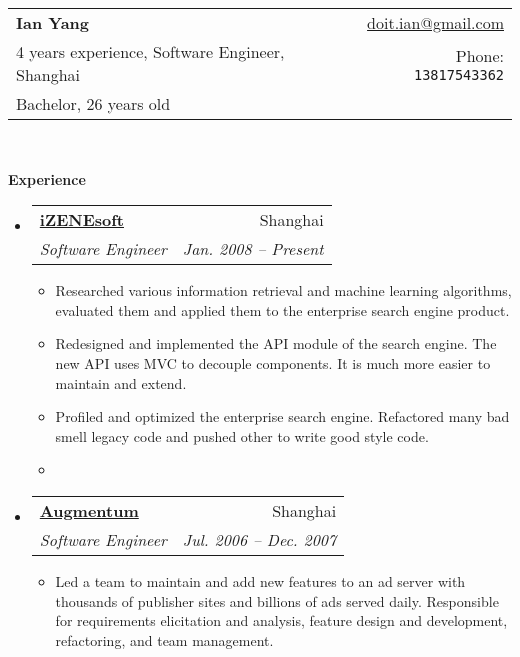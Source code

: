 \documentclass[letterpaper,11pt]{article}
\makeatletter
\newcommand{\resitem}[1]{\item #1 \vspace{-2pt}}
\newcommand{\resheading}[1]{{\large \colorbox{mygrey}{\begin{minipage}{\textwidth}{\textbf{#1 \vphantom{p\^{E}}}}\end{minipage}}}}
\newcommand{\ressubheading}[4]{
\begin{tabular*}{6.5in}{l@{\extracolsep{\fill}}r}
		\textbf{#1} & #2 \\
		\textit{#3} & \textit{#4} \\
\end{tabular*}\vspace{-6pt}}
\makeatother
\begin{document}
\newcommand{\mywebheader}{
\begin{tabular*}{7in}{l@{\extracolsep{\fill}}r}
	\textbf{\LARGE Ian Yang} & \href{mailto:doit.ian@gmail.com}{doit.ian@gmail.com} \\
    {\small 4 years experience, Software Engineer, Shanghai} & {\small Phone: \texttt{13817543362}} \\
    {\footnotesize Bachelor, 26 years old} & \\
	\end{tabular*}
\\
\vspace{0.1in}}

\mywebheader

\resheading{Experience}

\begin{itemize}
\item
  \ressubheading{\href{http://www.izenesoft.com/EN/home.html}{iZENEsoft}}{Shanghai}{%
    Software Engineer}{Jan. 2008 -- Present}

  { \footnotesize
    \begin{itemize}
      \resitem{Researched various information retrieval and machine learning
        algorithms, evaluated them and applied them to the enterprise search
        engine product.}
      
      \resitem{Redesigned and implemented the API module of the search
        engine. The new API uses MVC to decouple components. It is much more
        easier to maintain and extend.}

      \resitem{Profiled and optimized the enterprise search engine. Refactored
        many bad smell legacy code and pushed other to write good style code.}

      \resitem{
        
      }

      
    \end{itemize}
  }

\item \ressubheading{\href{http://www.augmentum.com/}{Augmentum}}{Shanghai}{%
      Software Engineer}{Jul. 2006 -- Dec. 2007}

  { \footnotesize
    \begin{itemize}
      \resitem{Led a team to maintain and add new features to an ad server with
        thousands of publisher sites and billions of ads served
        daily. Responsible for requirements elicitation and analysis, feature
        design and development, refactoring, and team management.}
      

\end{itemize}}
\end{itemize}
\end{document}
